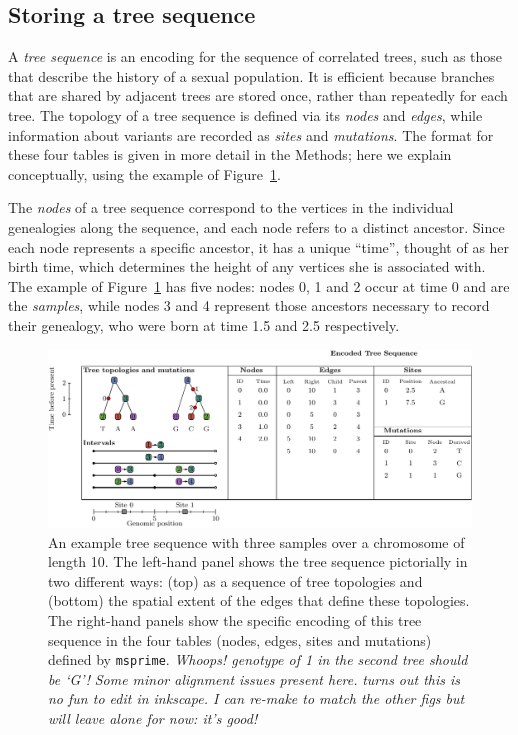 \documentclass{article}
\newcommand{\msprime}{\texttt{msprime}}
\newcommand{\plr}[1]{{\em \color{blue} #1}}
\newcommand{\jk}[1]{{\em \color{red} #1}}
\begin{document}
\subsection*{Storing a tree sequence}

A \emph{tree sequence} is an encoding for the sequence of correlated trees,
such as those that describe the history of a sexual population.
It is efficient because branches that are shared by adjacent trees are stored once, 
rather than repeatedly for each tree.
The topology of a tree sequence is defined via its \emph{nodes} and \emph{edges},
while information about variants are recorded as \emph{sites} and \emph{mutations}.
The format for these four tables is given in more detail in the Methods;
here we explain conceptually,
using the example of Figure~\ref{fig:example_tree_sequence}.

The \emph{nodes} of a tree sequence 
correspond to the vertices in the individual genealogies along the sequence,
and each node refers to a distinct ancestor.
Since each node represents a specific ancestor, it has a unique ``time'',
thought of as her birth time, which determines the height of any vertices
she is associated with. 
The example of Figure~\ref{fig:example_tree_sequence} has five nodes:
nodes 0, 1 and 2 occur at time 0 and are the \emph{samples},
while nodes 3 and 4 represent those ancestors necessary to record their genealogy,
who were born at time 1.5 and 2.5 respectively.

\begin{figure}
    \begin{center}
        \includegraphics[width=\textwidth]{example_tree_sequence}
    \end{center}
    \caption{
        An example tree sequence with three samples over a chromosome of length 10.
        The left-hand panel shows the tree sequence pictorially in two different ways:
        (top) as a sequence of tree topologies 
        and (bottom) the spatial extent of the edges that define these topologies. 
        The right-hand panels show the specific encoding
        of this tree sequence in the four tables (nodes, edges, sites and mutations) 
        defined by \msprime.
        \plr{Whoops!  genotype of 1 in the second tree should be `G'!}
        \jk{Some minor alignment issues present here.}
        \plr{turns out this is no fun to edit in inkscape.  
            I can re-make to match the other figs
            but will leave alone for now: it's good!}
        \label{fig:example_tree_sequence}
    }
\end{figure}
\end{document}

